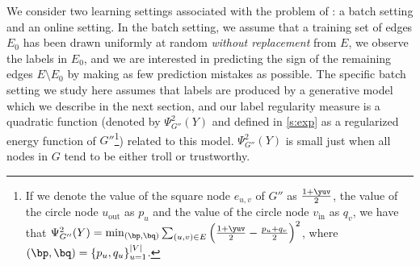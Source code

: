 \bigskip

We consider two learning settings associated with the problem of \esp{}: a batch
setting and an online setting. In the batch setting, we assume that a training set
of edges $E_0$ has been drawn uniformly at random \emph{without replacement} from $E$, we observe
the labels in $E_0$, and we are interested in predicting the sign of the remaining edges $E
\setminus E_0$ by making as few prediction mistakes as possible.
The specific batch setting
we study here assumes that labels are produced by a
generative model which we describe in the next section, and our label regularity measure is a
quadratic function (denoted by $\Psi^2_{G''}(Y)$ and defined in \autoref{s:exp} as a regularized
energy function of $G''$\footnote{If we denote the value of the square node $e_{u,v}$ of $G''$ as
$\frac{1+\yuv}{2}$, the value of the circle node $u_{\mathrm{out}}$ as $p_u$ and the value of the
circle node $v_{\mathrm{in}}$ as $q_v$, we have that
$\Psi^2_{G''}(Y) = \min_{(\bp,\bq)} \sum_{(u,v) \in E} \left(\frac{1+\yuv}{2} - \frac{p_u+q_v}{2}
\right)^2$, where $(\bp,\bq) =\{p_u, q_u\}_{u=1}^{|V|}$.})
related to this model. $\Psi^2_{G''}(Y)$ is small just when all nodes in $G$ tend to be either troll
or trustworthy. 

